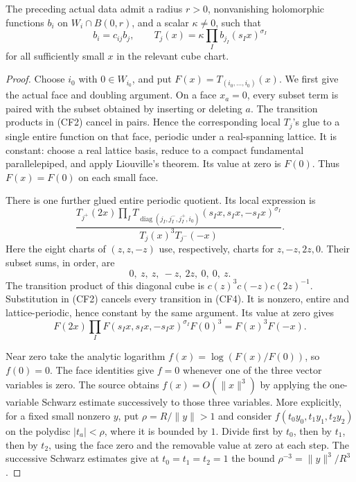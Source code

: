 \begin{srlemma}
\label{lem:ftb-cube-local-third-difference}
The preceding actual data admit a radius \(r>0\), nonvanishing
holomorphic functions \(b_i\) on \(W_i\cap B(0,r)\), and a scalar
\(\kappa\ne0\), such that
\[
 b_i=c_{ij}b_j,\qquad
 T_j(x)=\kappa\prod_I b_{j_I}(s_Ix)^{\sigma_I}                \tag{CF3}
\]
for all sufficiently small \(x\) in the relevant cube chart.
\end{srlemma}

\begin{proof}
Choose \(i_0\) with \(0\in W_{i_0}\), and put
\(F(x)=T_{(i_0,\ldots,i_0)}(x)\).
We first give the actual face and doubling argument.
On a face \(x_a=0\), every subset term is paired with the subset
obtained by inserting or deleting \(a\).  The transition products in
(CF2) cancel in pairs.  Hence the corresponding local \(T_j\)'s glue to
a single entire function on that face, periodic under a real-spanning
lattice.  It is constant: choose a real lattice basis, reduce to a
compact fundamental parallelepiped, and apply Liouville's theorem.
Its value at zero is \(F(0)\).  Thus \(F(x)=F(0)\) on each small face.

There is one further glued entire periodic quotient.  Its local
expression is
\[
 \frac{T_{j^+}(2x)
       \prod_I T_{\operatorname{diag}(j_I,j^-_I,j^+_I,i_0)}
                    (s_Ix,s_Ix,-s_Ix)^{\sigma_I}}
      {T_j(x)^3T_{j^-}(-x)}.                               \tag{CF4}
\]
Here the eight charts of \((z,z,-z)\) use, respectively, charts for
\(z,-z,2z,0\). Their subset sums, in order, are
\[
                    0,\ z,\ z,\ -z,\ 2z,\ 0,\ 0,\ z.
\]
The transition product of this diagonal cube is
\(c(z)^3c(-z)c(2z)^{-1}\).  Substitution in (CF2) cancels every
transition in (CF4).  It is nonzero, entire and lattice-periodic,
hence constant by the same argument.  Its value at zero gives
\[
 F(2x)\prod_I F(s_Ix,s_Ix,-s_Ix)^{\sigma_I}F(0)^3
                         =F(x)^3F(-x).                    \tag{CF5}
\]

Near zero take the analytic logarithm
\(f(x)=\log(F(x)/F(0))\), so \(f(0)=0\).
The face identities give \(f=0\) whenever one of the three vector
variables is zero.  The source obtains
\(f(x)=O(\|x\|^3)\) by applying the one-variable Schwarz estimate
successively to those three variables.  More explicitly, for a fixed
small nonzero \(y\), put \(\rho=R/\|y\|>1\) and consider
\(f(t_0y_0,t_1y_1,t_2y_2)\) on the polydisc
\(|t_a|<\rho\), where it is bounded by \(1\).
Divide first by \(t_0\), then by \(t_1\), then by \(t_2\), using
the face zero and the removable value at zero at each step.
The successive Schwarz estimates give at \(t_0=t_1=t_2=1\)
the bound \(\rho^{-3}=\|y\|^3/R^3\).


\end{proof}
